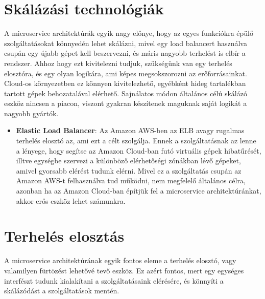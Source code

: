 \documentclass[11pt,magyar,a4paper,oneside,]{report}
\begin{document}
\section{Skálázási
technológiák}\label{skuxe1luxe1zuxe1si-technoluxf3giuxe1k}

A microservice architektúrák egyik nagy előnye, hogy az egyes funkciókra
épülő szolgáltatásokat könnyedén lehet skálázni, mivel egy load
balancert használva csupán egy újabb gépet kell beszervezni, és máris
nagyobb terhelést is elbír a rendszer. Ahhoz hogy ezt kivitelezni
tudjuk, szükségünk van egy terhelés elosztóra, és egy olyan logikára,
ami képes megsokszorozni az erőforrásainkat. Cloud-os környezetben ez
könnyen kivitelezhető, egyébként hideg tartalékban tartott gépek
behozatalával elérhető. Sajnálatos módon általános célú skálázó eszköz
nincsen a piacon, viszont gyakran készítenek maguknak saját logikát a
nagyobb gyártók.

\begin{itemize}
\itemsep1pt\parskip0pt
\item
  \textbf{Elastic Load Balancer}: Az Amazon AWS-ben az ELB avagy
  rugalmas terhelés elosztó az, ami ezt a célt szolgálja. Ennek a
  szolgáltatásnak az lenne a lényege, hogy segítse az Amazon Cloud-ban
  futó virtuális gépek hibatűrését, illtve egységbe szervezi a különböző
  elérhetőségi zónákban lévő gépeket, amivel gyorsabb elérést tudunk
  elérni. Mivel ez a szolgáltatás csupán az Amazon AWS-t felhasználva
  tud működni, nem megfelelő általános célra, azonban ha az Amazon
  Cloud-ban építjük fel a microservice architektúránkat, akkor erős
  eszköz lehet számunkra.
\end{itemize}

\section{Terhelés elosztás}\label{terheluxe9s-elosztuxe1s}

A microservice architektúrának egyik fontos eleme a terhelés elosztó,
vagy valamilyen fürtözést lehetővé tevő eszköz. Ez azért fontos, mert
egy egységes interfészt tudunk kialakítani a szolgáltatásaink elérésére,
és könnyíti a skálázódást a szolgáltatások mentén.
\end{document}
